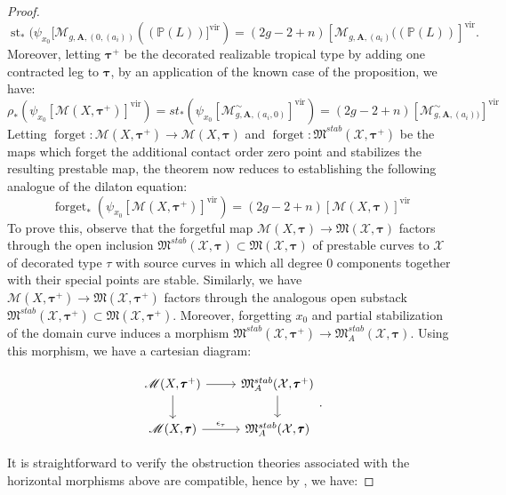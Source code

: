 \documentclass[12pt, oneside]{amsart}   	%
\newcommand{\vir}{\operatorname{vir}}
\newcommand{\st}{\operatorname{st}}
\newcommand{\forget}{\operatorname{forget}}
\numberwithin{equation}{section}
\numberwithin{thm}{section}
\numberwithin{figure}{section}
\begin{document}
\begin{proof}
\[\st_*(\psi_{x_0}[\mathscr{M}_{g,\textbf{A},(0,(a_i))}((\mathbb{P}(L))]^{\vir}) = (2g-2+n)[\mathscr{M}_{g,\textbf{A},(a_i)}((\mathbb{P}(L))]^{\vir}.\]
Moreover, letting $\pmb\tau^{+}$ be the decorated realizable tropical type by adding one contracted leg to $\pmb\tau$, by an application of the known case of the proposition, we have:
\[\rho_*(\psi_{x_0}[\mathscr{M}(X,\pmb\tau^+)]^{\vir}) = st_*(\psi_{x_0}[\mathscr{M}^{\sim}_{g,\textbf{A},(a_i,0)}]^{\vir}) = (2g-2+n)[\mathscr{M}^{\sim}_{g,\textbf{A},(a_i))}]^{\vir}\]
Letting $\forget: \mathscr{M}(X,\pmb\tau^+) \rightarrow \mathscr{M}(X,\pmb\tau)$ and $\forget: \mathfrak{M}^{stab}(\mathcal{X},\pmb\tau^+)$ be the maps which forget the additional contact order zero point and stabilizes the resulting prestable map, the theorem now reduces to establishing the following analogue of the dilaton equation:
\[\forget_*(\psi_{x_0}[\mathscr{M}(X,\pmb\tau^+)]^{\vir}) = (2g-2+n)[\mathscr{M}(X,\pmb\tau)]^{\vir}\]
To prove this, observe that the forgetful map $\mathscr{M}(X,\pmb\tau) \rightarrow \mathfrak{M}(\mathcal{X},\pmb\tau)$ factors through the open inclusion $\mathfrak{M}^{stab}(\mathcal{X},\pmb\tau) \subset \mathfrak{M}(\mathcal{X},\pmb\tau)$ of prestable curves to $\mathcal{X}$ of decorated type $\tau$ with source curves in which all degree $0$ components together with their special points are stable. Similarly, we have $\mathscr{M}(X,\pmb\tau^+) \rightarrow \mathfrak{M}(\mathcal{X},\pmb\tau^+)$ factors through the analogous open substack $\mathfrak{M}^{stab}(\mathcal{X},\pmb\tau^+) \subset \mathfrak{M}(\mathcal{X},\pmb\tau^+)$. Moreover, forgetting $x_0$ and partial stabilization of the domain curve induces a morphism $\mathfrak{M}^{stab}(\mathcal{X},\pmb\tau^+) \rightarrow \mathfrak{M}_{A}^{stab}(\mathcal{X},\pmb\tau)$. Using this morphism, we have a cartesian diagram:

\[
\begin{tikzcd}
\mathscr{M}(X,\pmb\tau^+) \arrow{r}\arrow{d} & \mathfrak{M}^{stab}_{A}(\mathcal{X},\pmb\tau^+)\arrow{d}\\
\mathscr{M}(X,\pmb\tau) \arrow[r,"\epsilon_{\tau}"] & \mathfrak{M}^{stab}_{A}(\mathcal{X},\pmb\tau)
\end{tikzcd}.
\]

It is straightforward to verify the obstruction theories associated with the horizontal morphisms above are compatible, hence by \cite{vpull}, we have:


\end{proof}
\end{document}
